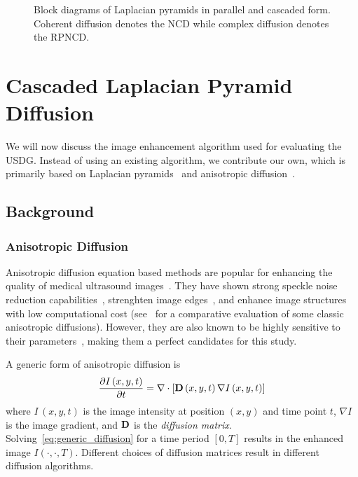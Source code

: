 \begin{figure}
\begin{minipage}[c]{0.53\textwidth}
    \label{fig:clpd}
  \end{minipage}
  \caption{Block diagrams of Laplacian pyramids in parallel and cascaded form.
    Coherent diffusion denotes the NCD while complex diffusion denotes the RPNCD.
  }\label{fig:filters}
  \vspace{-0.15in}
\end{figure}
%
\section{Cascaded Laplacian Pyramid Diffusion}\label{section:filter}
%
We will now discuss the image enhancement algorithm used for evaluating the USDG.
Instead of using an existing algorithm, we contribute our own, which is primarily based on Laplacian pyramids~\cite{zhang_multiscale_2006, zhang_nonlinear_2007, kang_new_2016} and anisotropic diffusion~\cite{perona_scalespace_1990, weickert_anisotropic_1998}.

\subsection{Background}
\subsubsection{Anisotropic Diffusion}\label{section:diffusion}
%
Anisotropic diffusion equation based methods are popular for enhancing the quality of medical ultrasound images~\cite{perona_scalespace_1990, weickert_anisotropic_1998, yongjianyu_speckle_2002, contrerasortiz_ultrasound_2012}.
They have shown strong speckle noise reduction capabilities~\cite{duarte-salazar_speckle_2020}, strenghten image edges~\cite{zhang_multiscale_2006}, and enhance image structures~\cite{abd-elmoniem_realtime_2002, kang_new_2016} with low computational cost (see~\cite{finn_echocardiographic_2011} for a comparative evaluation of some classic anisotropic diffusions).
However, they are also known to be highly sensitive to their parameters~\cite{duarte-salazar_speckle_2020}, making them a perfect candidates for this study.

A generic form of anisotropic diffusion is
\begin{align}
  \frac{\partial I\,(x, y, t)}{\partial t} = \nabla \cdot [ \mathbf{D}\,(x, y, t) \, \nabla I\,(x, y, t) ] \label{eq:generic_diffusion}
\end{align}
where \(I\,(x, y, t)\) is the image intensity at position \((x, y)\) and time point \(t\), \(\nabla I\) is the image gradient, and \(\mathbf{D}\) is the \textit{diffusion matrix}.
Solving~\cref{eq:generic_diffusion} for a time period \([0, T]\) results in the enhanced image \(I\left(\cdot, \cdot, T\right)\).
Different choices of diffusion matrices result in different diffusion algorithms.

